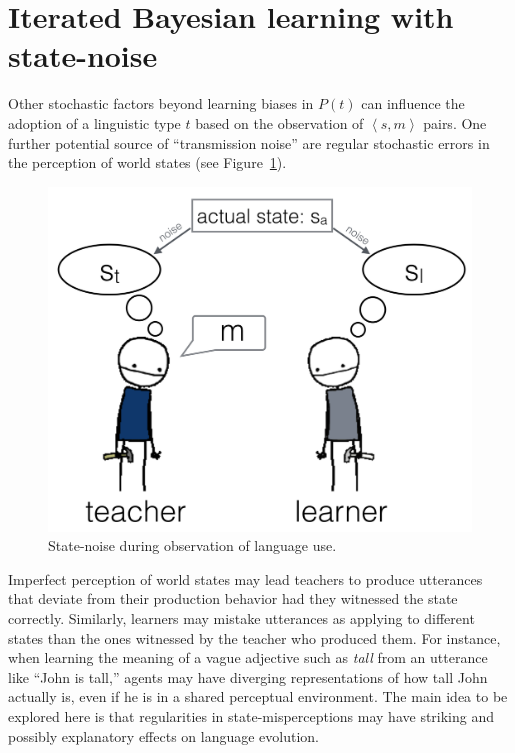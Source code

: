 \documentclass[10pt,a4paper]{article}
\newcommand{\tuple}[1]{\ensuremath{\left\langle #1 \right\rangle}}
\begin{document}

\section{Iterated Bayesian learning with state-noise}

Other stochastic factors beyond learning biases in $P(t)$ can influence the adoption of a
linguistic type $t$ based on the observation of $\tuple{s,m}$ pairs. One further potential source
of ``transmission noise'' are regular stochastic errors in the perception of world states (see
Figure~\ref{fig:cartoon}).
%
\begin{figure}[t]
  \centering
  \includegraphics[width = 0.75\linewidth]{pics/cartoon_picture.png}
  \caption{State-noise during observation of language use.}
  \label{fig:cartoon}
\end{figure}
% 
Imperfect perception of world states
may lead teachers to produce utterances that deviate from their production behavior had they
witnessed the state correctly. Similarly, learners may mistake utterances as applying to 
different states than the ones witnessed by the teacher who produced them. For instance, when learning the meaning of a vague adjective
such as {\em tall} from an utterance like ``John is tall,'' agents may have diverging
representations of how tall John actually is, even if he is in a shared perceptual
environment. The main idea to be explored here is that regularities in state-misperceptions may
have striking and possibly explanatory effects on language evolution. 
\end{document}
